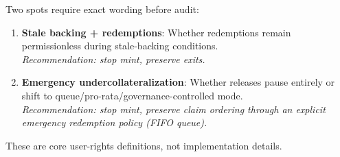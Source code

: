 \documentclass[11pt,a4paper]{article}
\begin{document}
Two spots require exact wording before audit:

\begin{enumerate}[leftmargin=2em]
\item \textbf{Stale backing + redemptions}: Whether redemptions remain permissionless during stale-backing conditions.\\
\textit{Recommendation: stop mint, preserve exits.}

\item \textbf{Emergency undercollateralization}: Whether releases pause entirely or shift to queue/pro-rata/governance-controlled mode.\\
\textit{Recommendation: stop mint, preserve claim ordering through an explicit emergency redemption policy (FIFO queue).}
\end{enumerate}

These are core user-rights definitions, not implementation details.
\end{document}
